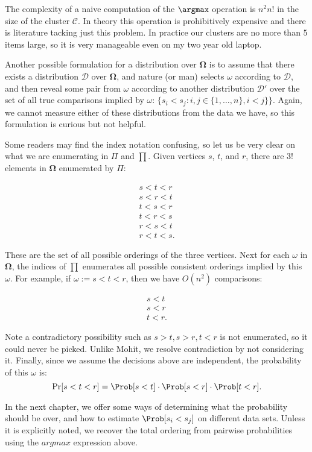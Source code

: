 \begin{remark}
The complexity of a naive computation of the $\argmax$ operation is $n^2 n!$ in the size of the cluster $\mathcal{C}.$ In theory this operation is prohibitively expensive and there is literature tacking just this problem. In practice our clusters are no more than $5$ items large, so it is very manageable even on my two year old laptop. 
\end{remark}

\begin{remark}
Another possible formulation for a distribution over $\pmb{\Omega}$ is to assume that there exists a distribution $\mathcal{D}$ over $\pmb{\Omega}$, and nature (or man) selects $\omega$ according to $\mathcal{D}$, and then reveal some pair from $\omega$ according to another distribution $\mathcal{D}'$ over the set of all true comparisons implied by $\omega$: $\{s_i < s_j : i,j \in \{1,\ldots, n\}, i < j\}\}$. Again, we cannot measure either of these distributions from the data we have, so this formulation is curious but not helpful.
\end{remark}

\begin{remark}
Some readers may find the index notation confusing, so let us be very clear on what we are enumerating in $\Pi$ and $\prod$. Given vertices $s$, $t$, and $r$, there are $3!$ elements in $\pmb{\Omega}$ enumerated by $\Pi$:

\begin{align*}
	s < t < r \\
	s < r < t \\
	t < s < r \\
	t < r < s \\
	r < s < t \\
	r < t < s.
\end{align*}

These are the set of all possible orderings of the three vertices. Next for each $\omega$ in $\pmb{\Omega}$, the indices of $\prod$ enumerates all possible consistent orderings implied by this $\omega$. For example, if $\omega := s < t < r$, then we have $O(n^2)$ comparisons:

\begin{align*}
	s < t \\
	s < r \\
	t < r.
\end{align*}

Note a contradictory possibility such as $s > t, s > r, t < r$ is not enumerated, so it could never be picked. Unlike Mohit, we resolve contradiction by not considering it. Finally, since we assume the decisions above are independent, the probability of this $\omega$ is:
\[
	\Pr[ s < t < r] = \Prob[s < t] \cdot \Prob[s < r] \cdot \Prob [t < r].
\]
\end{remark}

In the next chapter, we offer some ways of determining what the probability should be over, and how to estimate $\Prob[ s_i < s_j ]$ on different data sets.  Unless it is explicitly noted, we recover the total ordering from pairwise probabilities using the $argmax$ expression above.\newpage



